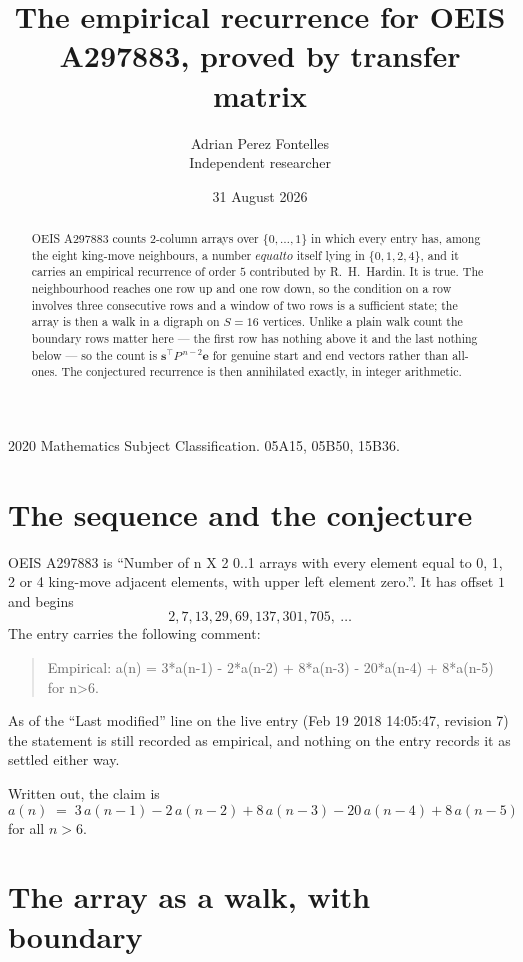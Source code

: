 \documentclass[11pt,a4paper]{article}
\title{The empirical recurrence for OEIS A297883, proved by transfer matrix}
\author{Adrian Perez Fontelles\\ \small Independent researcher}
\date{31 August 2026}
\theoremstyle{plain}
\theoremstyle{definition}
\begin{document}
\maketitle

\begin{abstract}
OEIS A297883 counts $2$-column arrays over $\{0,\dots,1\}$ in which every entry has,
among the eight king-move neighbours, a number $equal to$ itself lying in $\{0,1,2,4\}$, and it carries an empirical
recurrence of order $5$ contributed by R.~H.~Hardin. It is true. The neighbourhood
reaches one row up and one row down, so the condition on a row involves three consecutive
rows and a window of two rows is a sufficient state; the array is then a walk in a digraph
on $S=16$ vertices. Unlike a plain walk count the boundary rows matter here --- the first
row has nothing above it and the last nothing below --- so the count is
$\mathbf{s}^{\!\top}P^{\,n-2}\mathbf{e}$ for genuine start and end vectors rather than
all-ones. The conjectured recurrence is then annihilated exactly, in integer arithmetic.
\end{abstract}

\noindent\small 2020 Mathematics Subject Classification. 05A15, 05B50, 15B36.\normalsize

\section{The sequence and the conjecture}

OEIS A297883 is ``Number of n X 2 0..1 arrays with every element equal to 0, 1, 2 or 4 king-move adjacent elements, with upper left element zero.''. It has offset
$1$ and begins
\[
2, 7, 13, 29, 69, 137, 301, 705,\ \dots
\]
The entry carries the following comment:
\begin{quote}\small
Empirical: a(n) = 3*a(n-1) - 2*a(n-2) + 8*a(n-3) -  20*a(n-4) + 8*a(n-5) for n>6.
\end{quote}
As of the ``Last modified'' line on the live entry (Feb 19 2018 14:05:47, revision
7) the statement is still recorded as empirical, and nothing on the entry
records it as settled either way.

Written out, the claim is
\begin{equation}\label{eq:conj}
a(n)\;=\;3\,a(n-1) - 2\,a(n-2) + 8\,a(n-3) - 20\,a(n-4) + 8\,a(n-5)
\end{equation}
for all $n>6$.

\section{The array as a walk, with boundary}
\end{document}
